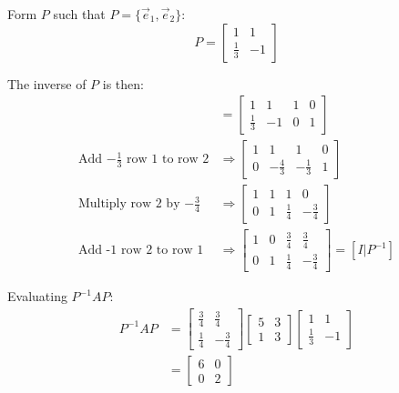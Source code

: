 \documentclass[11pt]{homework}
\begin{document}
Form $P$ such that $P=\{\vec e_1, \vec e_2\}$:
\begin{equation*}
  P = 
  \begin{bmatrix}
  1 & 1 \\
  \frac{1}{3} & -1
  \end{bmatrix}
\end{equation*}

The inverse of $P$ is then:
\begin{align*}
[P|I] &= 
  \left[
  \begin{array}{cc|cc}
  1           &  1 & 1 & 0 \\
  \frac{1}{3} & -1 & 0 & 1
  \end{array} 
  \right] \\
\text{Add $-\frac{1}{3}$ row 1 to row 2} 
  & \Rightarrow
  \left[
  \begin{array}{cc|cc}
  1  &  1           & 1 & 0 \\
  0  & -\frac{4}{3} & -\frac{1}{3} & 1
  \end{array}
  \right] \\
\text{Multiply row 2 by $-\frac{3}{4}$}
  & \Rightarrow
  \left[
  \begin{array}{cc|cc}
  1  & 1           & 1 & 0 \\
  0  & 1 & \frac{1}{4} & -\frac{3}{4}
  \end{array} 
  \right] \\
\text{Add -1 row 2 to row 1}
  & \Rightarrow
  \left[
  \begin{array}{cc|cc}
  1  & 0 & \frac{3}{4} & \frac{3}{4} \\
  0  & 1 & \frac{1}{4} & -\frac{3}{4}
  \end{array} 
  \right]
  = [I|P^{-1}]
\end{align*}

Evaluating $P^{-1}AP$:
\begin{align*}
P^{-1}AP  &=
  \begin{bmatrix}
    \frac{3}{4} & \frac{3}{4} \\
    \frac{1}{4} & -\frac{3}{4}
  \end{bmatrix} 
  \begin{bmatrix}
    5 & 3 \\
    1 & 3 
  \end{bmatrix}
  \begin{bmatrix}
    1 & 1 \\
    \frac{1}{3} & -1
  \end{bmatrix} \\
  &=
  \begin{bmatrix}
    6 & 0 \\
    0 & 2
  \end{bmatrix}
\end{align*}
\end{document}
